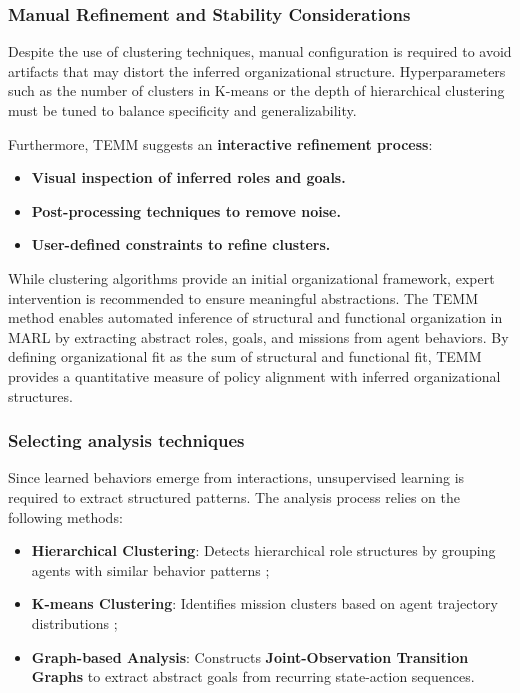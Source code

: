 \documentclass[pdflatex,sn-mathphys-num]{sn-jnl}%
\theoremstyle{thmstyleone}%
\theoremstyle{thmstyletwo}%
\theoremstyle{thmstylethree}%
\begin{document}
\subsubsection{Manual Refinement and Stability Considerations}

Despite the use of clustering techniques, manual configuration is required to avoid artifacts that may distort the inferred organizational structure. Hyperparameters such as the number of clusters in K-means or the depth of hierarchical clustering must be tuned to balance specificity and generalizability.

Furthermore, TEMM suggests an \textbf{interactive refinement process}:
\begin{itemize}
    \item \textbf{Visual inspection of inferred roles and goals.}
    \item \textbf{Post-processing techniques to remove noise.}
    \item \textbf{User-defined constraints to refine clusters.}
\end{itemize}

While clustering algorithms provide an initial organizational framework, expert intervention is recommended to ensure meaningful abstractions. The TEMM method enables automated inference of structural and functional organization in MARL by extracting abstract roles, goals, and missions from agent behaviors. By defining organizational fit as the sum of structural and functional fit, TEMM provides a quantitative measure of policy alignment with inferred organizational structures.

\subsubsection{Selecting analysis techniques}
Since learned behaviors emerge from interactions, unsupervised learning is required to extract structured patterns. The analysis process relies on the following methods:

\begin{itemize}
    \item \textbf{Hierarchical Clustering}: Detects hierarchical role structures by grouping agents with similar behavior patterns ;
    \item \textbf{K-means Clustering}: Identifies mission clusters based on agent trajectory distributions ;
    \item \textbf{Graph-based Analysis}: Constructs \textbf{Joint-Observation Transition Graphs} to extract abstract goals from recurring state-action sequences.
\end{itemize}
\end{document}
